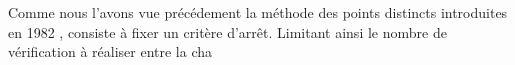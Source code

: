 	Comme nous l'avons vue précédement la méthode des points distincts introduites en 1982 \cite{Rivest}, consiste à fixer un critère d'arrêt. Limitant ainsi le nombre de vérification à réaliser entre la cha	

\endinput{}
